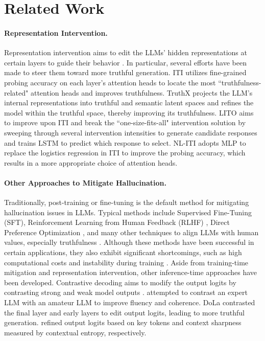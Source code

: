 \section{Related Work}
\label{sec:related_work}

\paragraph{Representation Intervention.}
Representation intervention aims to edit the LLMs' hidden representations at certain layers to guide their behavior \cite{panickssery2023steering,zou2023representation,cao2024personalized, li2024inference, chen2024truth}. In particular, several efforts have been made to steer them toward more truthful generation. ITI \cite{li2024inference} utilizes fine-grained probing accuracy on each layer's attention heads to locate the most ``truthfulness-related" attention heads and improves truthfulness. TruthX \cite{zhang2024truthx} projects the LLM's internal representations into truthful and semantic latent spaces and refines the model within the truthful space, thereby improving its truthfulness. LITO \cite{bayat2024enhanced} aims to improve upon ITI and break the ``one-size-fits-all" intervention solution by sweeping through several intervention intensities to generate candidate responses and trains LSTM to predict which response to select. NL-ITI \cite{hoscilowicz2024nl} adopts MLP to replace the logistics regression in ITI to improve the probing accuracy, which results in a more appropriate choice of attention heads.

\paragraph{Other Approaches to Mitigate Hallucination.} Traditionally, post-training or fine-tuning is the default method for mitigating hallucination issues in LLMs. Typical methods include Supervised Fine-Tuning (SFT), Reinforcement Learning from Human Feedback (RLHF) \cite{ouyang2022training}, Direct Preference Optimization \cite{rafailov2024direct}, and many other techniques to align LLMs with human values, especially truthfulness \cite{chen2024grath, tian2023fine, hu2024mitigating}. Although these methods have been successful in certain applications, they also exhibit significant shortcomings, such as high computational costs and instability during training \cite{casper2023open}. 
Aside from training-time mitigation and representation intervention, other inference-time approaches have been developed. Contrastive decoding aims to modify the output logits by contrasting strong and weak model outputs \cite{o2023contrastive, zhang2023alleviating, chen2024lower}. \citet{li2022contrastive} attempted to contrast an expert LLM with an amateur LLM to improve fluency and coherence. DoLa \cite{chuang2023dola} contrasted the final layer and early layers to edit output logits, leading to more truthful generation. \citet{kai2024sh2,chen2024context} refined output logits based on key tokens and context sharpness measured by contextual entropy, respectively.
